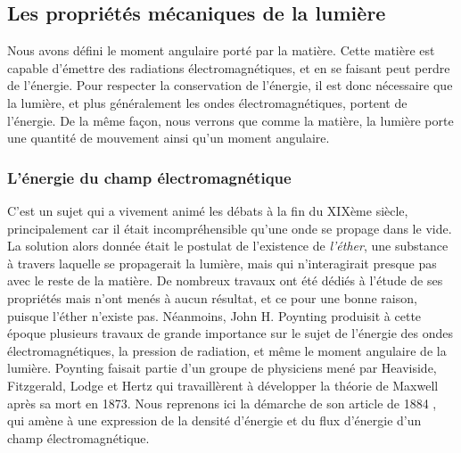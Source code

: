 \subsection{Les propriétés mécaniques de la lumière}
Nous avons défini le moment angulaire porté par la matière. Cette matière est capable d'émettre des radiations électromagnétiques, et en se faisant peut perdre de l'énergie. Pour respecter la conservation de l'énergie, il est donc nécessaire que la lumière, et plus généralement les ondes électromagnétiques, portent de l'énergie. De la même façon, nous verrons que comme la matière, la lumière porte une quantité de mouvement ainsi qu'un moment angulaire.

\subsubsection{L'énergie du champ électromagnétique} 
C'est un sujet qui a vivement animé les débats à la fin du XIXème siècle, principalement car il était incompréhensible qu'une onde se propage dans le vide. La solution alors donnée était le postulat de l'existence de \textit{l'éther}, une substance à travers laquelle se propagerait la lumière, mais qui n’interagirait presque pas avec le reste de la matière. De nombreux travaux ont été dédiés à l'étude de ses propriétés mais n'ont menés à aucun résultat, et ce pour une bonne raison, puisque l'éther n'existe pas. Néanmoins, John H. Poynting produisit à cette époque plusieurs travaux de grande importance sur le sujet de l'énergie des ondes électromagnétiques, la pression de radiation, et même le moment angulaire de la lumière. Poynting faisait partie d'un groupe de physiciens mené par Heaviside, Fitzgerald, Lodge et Hertz qui travaillèrent à développer la théorie de Maxwell après sa mort en 1873. Nous reprenons ici la démarche de son article de 1884 , qui amène à une expression de la densité d'énergie et du flux d'énergie d'un champ électromagnétique.

